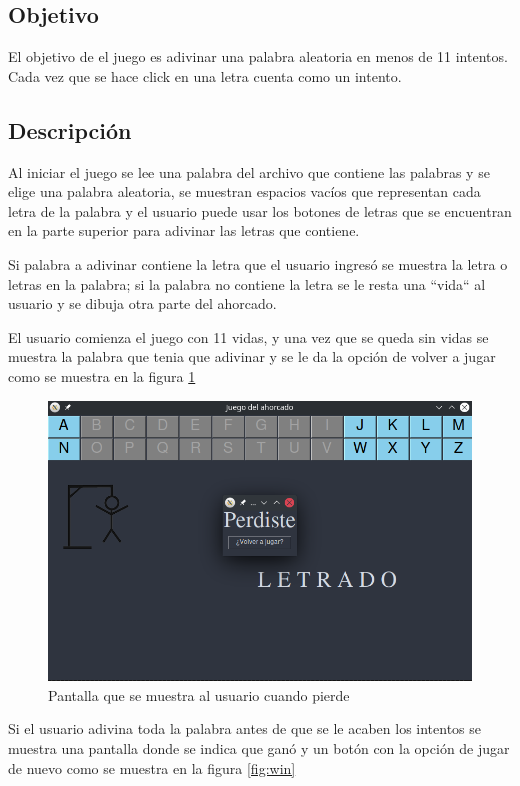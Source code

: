 \documentclass{article}
\begin{document}
\subsection{Objetivo}

El objetivo de el juego es adivinar una palabra aleatoria en menos de 11 intentos. Cada vez que se hace click en una letra cuenta como un intento.

\subsection{Descripción}

Al iniciar el juego se lee una palabra del archivo que contiene las palabras y se elige una palabra aleatoria, se muestran espacios vacíos que representan cada letra de la palabra y el usuario puede usar los botones de letras que se encuentran en la parte superior para adivinar las letras que contiene.

Si palabra a adivinar contiene la letra que el usuario ingresó se muestra la letra o letras en la palabra; si la palabra no contiene la letra se le resta una ``vida`` al usuario y se dibuja otra parte del ahorcado.

El usuario comienza el juego con 11 vidas, y una vez que se queda sin vidas se muestra la palabra que tenia que adivinar y se le da la opción de volver a jugar como se muestra en la figura \ref{fig:lose}

\begin{figure}[h]
\includegraphics[width=\textwidth]{lose.png}
\caption{Pantalla que se muestra al usuario cuando pierde}
\label{fig:lose}
\end{figure}

Si el usuario adivina toda la palabra antes de que se le acaben los intentos se muestra una pantalla donde se indica que ganó y un botón con la opción de jugar de nuevo como se muestra en la figura \ref{fig:win}
\end{document}
